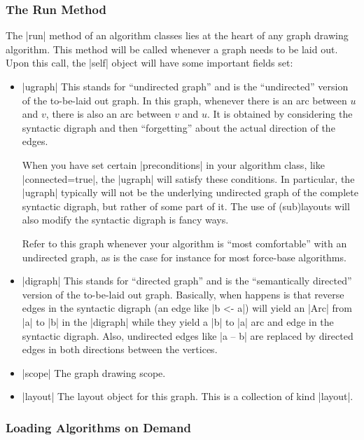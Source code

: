 \subsubsection{The Run Method}

The |run| method of an algorithm classes lies at the heart of any graph drawing
algorithm. This method will be called whenever a graph needs to be laid out.
Upon this call, the |self| object will have some important fields set:
%
\begin{itemize}
    \item |ugraph| This stands for ``undirected graph'' and is the
        ``undirected'' version of the to-be-laid out graph. In this graph,
        whenever there is an arc between $u$ and $v$, there is also an arc
        between $v$ and $u$. It is obtained by considering the syntactic
        digraph and then ``forgetting'' about the actual direction of the
        edges.

        When you have set certain |preconditions| in your algorithm class, like
        |connected=true|, the |ugraph| will satisfy these conditions. In
        particular, the |ugraph| typically will not be the underlying
        undirected graph of the complete syntactic digraph, but rather of some
        part of it. The use of (sub)layouts will also modify the syntactic
        digraph is fancy ways.

        Refer to this graph whenever your algorithm is ``most comfortable''
        with an undirected graph, as is the case for instance for most
        force-base algorithms.
    \item |digraph| This stands for ``directed graph'' and is the
        ``semantically directed'' version of the to-be-laid out graph.
        Basically, when happens is that reverse edges in the syntactic digraph
        (an edge like |b <- a|) will yield an |Arc| from |a| to |b| in the
        |digraph| while they yield a |b| to |a| arc and edge in the syntactic
        digraph. Also, undirected edges like |a -- b| are replaced by directed
        edges in both directions between the vertices.
    \item |scope| The graph drawing scope.
    \item |layout| The layout object for this graph. This is a collection of
        kind |layout|.
\end{itemize}


\subsubsection{Loading Algorithms on Demand}


